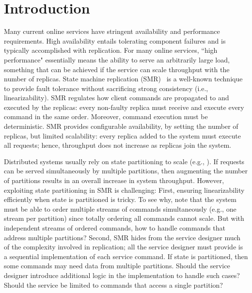 
\section{Introduction}
\label{sec:introduction}

Many current online services have stringent availability and performance requirements.
High availability entails tolerating component failures and is typically accomplished with replication.
For many online services, ``high performance" essentially means the ability to serve an arbitrarily large load, something that can be achieved if the service can scale throughput with the number of replicas.
%
State machine replication (SMR)~\cite{Lam78, Sch90} is a well-known technique to provide fault tolerance without sacrificing strong consistency (i.e., linearizability).
%
SMR regulates how client commands are propagated to and executed by the replicas: every \mbox{non-faulty} replica must receive and execute every command in the same order. Moreover, command execution must be deterministic.
%
SMR provides configurable availability, by setting the number of replicas, but limited scalability: every replica added to the system must execute all requests; hence, throughput does not increase as replicas join the system.

Distributed systems usually rely on state partitioning to scale (e.g., \cite{facebookTAO, sciascia2012sdur}).
If requests can be served simultaneously by multiple partitions, then augmenting the number of partitions results in an overall increase in system throughput.
However, exploiting state partitioning in SMR is challenging:
First, ensuring linearizability efficiently when state is partitioned is tricky.  
To see why, note that the system must be able to order multiple streams of commands simultaneously (e.g., one stream per partition) since totally ordering all commands cannot scale.
But with independent streams of ordered commands, how to handle commands that address multiple partitions?
%
Second, SMR hides from the service designer much of the complexity involved in replication; all the service designer must provide is a sequential implementation of each service command.
If state is partitioned, then some commands may need data from multiple partitions.
Should the service designer introduce additional logic in the implementation to handle such cases?
Should the service be limited to commands that access a single partition?

